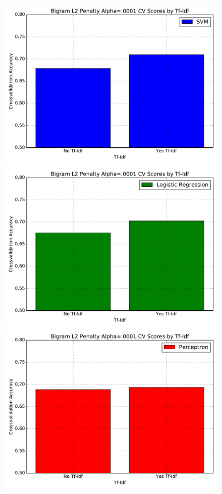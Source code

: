 \documentclass[a4paper, 12pt]{article}
\begin{document}
\begin{figure}[!htb]
  \includegraphics[width=\linewidth]{FiguresSVM_TFIDF_on_off_hinge.pdf}
\endminipage\hfill
{}
  \includegraphics[width=\linewidth]{FiguresSVM_TFIDF_on_off_log.pdf}
\endminipage\hfill
{}
  \includegraphics[width=\linewidth]{FiguresSVM_TFIDF_on_off_perceptron.pdf}

\end{figure}
\end{document}
